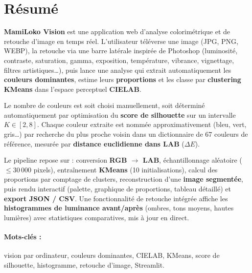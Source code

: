 \documentclass[11pt,a4paper]{article}
\begin{document}
\newpage

\tableofcontents
\newpage

\section*{Résumé}

\textbf{MamiLoko Vision} est une application web d'analyse colorimétrique et de
retouche d'image en temps réel. L'utilisateur téléverse une image
(JPG, PNG, WEBP), la retouche via une barre latérale inspirée de Photoshop
(luminosité, contraste, saturation, gamma, exposition, température,
vibrance, vignettage, filtres artistiques\ldots), puis lance une analyse qui
extrait automatiquement les \textbf{couleurs dominantes}, estime leurs
\textbf{proportions} et les classe par \textbf{clustering KMeans} dans
l'espace perceptuel \textbf{CIELAB}.

Le nombre de couleurs est soit choisi manuellement, soit déterminé
automatiquement par optimisation du \textbf{score de silhouette} sur un
intervalle $K \in [2, 8]$. Chaque couleur extraite est nommée
approximativement (bleu, vert, gris\ldots) par recherche du plus proche
voisin dans un dictionnaire de 67 couleurs de référence, mesurée par
\textbf{distance euclidienne dans LAB} ($\Delta E$).

Le pipeline repose sur : conversion \textbf{RGB $\rightarrow$ LAB},
échantillonnage aléatoire ($\leq 30\,000$ pixels), entraînement
\textbf{KMeans} (10 initialisations), calcul des proportions par comptage
de clusters, reconstruction d'une \textbf{image segmentée}, puis rendu
interactif (palette, graphique de proportions, tableau détaillé) et
\textbf{export JSON / CSV}. Une fonctionnalité de retouche intégrée
affiche les \textbf{histogrammes de luminance avant/après} (ombres, tons
moyens, hautes lumières) avec statistiques comparatives, mis à jour en
direct.

\paragraph{Mots-clés :} vision par ordinateur, couleurs dominantes,
CIELAB, KMeans, score de silhouette, histogramme, retouche d'image,
Streamlit.
\end{document}
